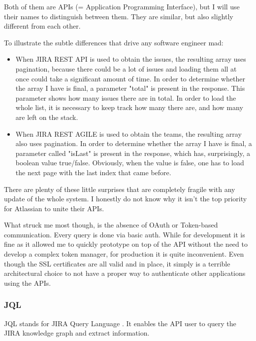 Both of them are APIs (= Application Programming Interface), but I will use their names to distinguish between them. They are similar, but also slightly different from each other. 

To illustrate the subtle differences that drive any software engineer mad:

\begin{itemize}
	\item When JIRA REST API is used to obtain the issues, the resulting array uses pagination, because there could be a lot of issues and loading them all at once could take a significant amount of time. In order to determine whether the array I have is final, a parameter "total" is present in the response. This parameter shows how many issues there are in total. In order to load the whole list, it is necessary to keep track how many there are, and how many are left on the stack.
	
	\item When JIRA REST AGILE is used to obtain the teams, the resulting array also uses pagination. In order to determine whether the array I have is final, a parameter called "isLast" is present in the response, which has, surprisingly, a boolean value true/false. Obviously, when the value is false, one has to load the next page with the last index that came before.
\end{itemize}

There are plenty of these little surprises that are completely fragile with any update of the whole system. I honestly do not know why it isn't the top priority for Atlassian to unite their APIs.

What struck me most though, is the absence of OAuth or Token-based communication. Every query is done via basic auth. While for development it is fine as it allowed me to quickly prototype on top of the API without the need to develop a complex token manager, for production it is quite inconvenient. Even though the SSL certificates are all valid and in place, it simply is a terrible architectural choice to not have a proper way to authenticate other applications using the APIs.

\subsubsection{JQL}

JQL stands for JIRA Query Language \cite{jql}. It enables the API user to query the JIRA knowledge graph and extract information.


